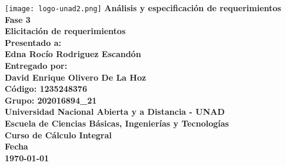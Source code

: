 \begin{titlepage}
    \begin{center}
        \texttt{[image: logo-unad2.png]}
        \textbf{Análisis y especificación de requerimientos\\}
        \vspace*{1cm}
        \textbf{
            Fase 3\\
            Elicitación de requerimientos\\
        }
        \vspace*{1cm}
        \textbf{
            Presentado a:\\
            Edna Rocío Rodriguez Escandón\\
        }
        \vspace*{1cm}
        \textbf{Entregado por:\\}
        \vspace*{1cm}
        \textbf{
            David Enrique Olivero De La Hoz\\
            Código: 1235248376\\
            Grupo: 202016894\_21\\
        }
        \vspace*{3cm}
        \textbf{
            Universidad Nacional Abierta y a Distancia - UNAD\\
            Escuela de Ciencias Básicas, Ingenierías y Tecnologías\\ 
            Curso de Cálculo Integral\\ 
            Fecha\\
            \today
        }
    \end{center}
\end{titlepage}